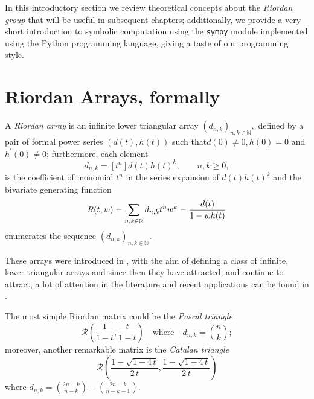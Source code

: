 
In this introductory section we review theoretical concepts about the
\textit{Riordan group} that will be useful in subsequent chapters;
additionally, we provide a very short introduction to symbolic computation
using the \verb|sympy| module implemented using the Python programming
language, giving a taste of our programming style.


\section{Riordan Arrays, formally}

A \textit{Riordan array} is an infinite lower triangular array $(d_{n,k} )_{n,k
\in \mathbb{N}},$ defined by a pair of formal power series $(d(t),h(t))$ such
that\newline\noindent$d(0)\neq 0, h(0)=0$ and $h^\prime(0)\neq 0$; furthermore,
each element \begin{displaymath}
    d_{n,k}=[t^n]d(t)h(t)^k, \qquad n,k \geq 0,
\end{displaymath}
is the coefficient of monomial $t^{n}$ in the series
expansion of $d(t)h(t)^{k}$ %
and the bivariate generating function
\begin{equation}
    \label{bgf}
    R(t,w) = \sum_{n,k \in\mathbb{N}}{d_{n,k} t^n w^k} = {d(t) \over 1-wh(t)}
\end{equation}
enumerates the sequence $(d_{n,k})_{n,k \in\mathbb{N}}$.

These arrays were introduced in \citep{SHAPIRO1991229}, with the aim of
defining a class of infinite, lower triangular arrays and since then they have
attracted, and continue to attract, a lot of attention in the literature and
recent applications can be found in \citep{LUZON201475}.

\begin{example}
The most simple Riordan matrix could be the \textit{Pascal triangle}
$$\mathcal{R}\left(\frac{1}{1-t}, \frac{t}{1-t}\right)\quad\text{where}\quad
d_{n,k}={n\choose k};$$ moreover, another remarkable matrix is the
\textit{Catalan triangle}
$$\mathcal{R}\left(\frac{1-\sqrt{1-4\,t}}{2\,t}, \frac{1-\sqrt{1-4\,t}}{2\,t}\right)$$
where $\displaystyle d_{n,k}={{2n-k}\choose{n-k}} - {{2n-k}\choose{n-k-1}}$.
\end{example}

